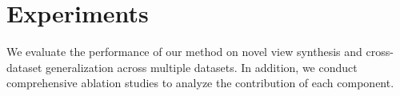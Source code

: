 \documentclass[runningheads]{llncs}
\begin{document}



\section{Experiments}
We evaluate the performance of our method on novel view synthesis and cross-dataset generalization across multiple datasets. In addition, we conduct comprehensive ablation studies to analyze the contribution of each component.
\end{document}
